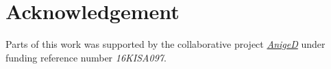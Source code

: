 \section{Acknowledgement}
Parts of this work was supported by the collaborative project \hyperlink{https://www.destatis.de/DE/Ueber-uns/AnigeD/_inhalt.html}{\textit{AnigeD}} under funding reference number \textit{16KISA097}. 

